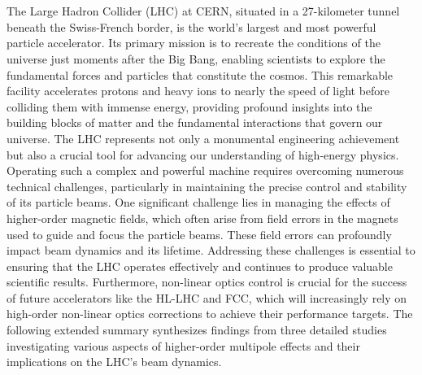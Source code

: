 \chapter{}





{
\fontsize{\fontsizesummary}{\fontskipsummary}\selectfont

The Large Hadron Collider (LHC) at CERN, situated in a 27-kilometer tunnel beneath the Swiss-French
border, is the world's largest and most powerful particle accelerator. Its primary mission is to
recreate the conditions of the universe just moments after the Big Bang, enabling scientists to
explore the fundamental forces and particles that constitute the cosmos. This remarkable facility
accelerates protons and heavy ions to nearly the speed of light before colliding them with immense
energy, providing profound insights into the building blocks of matter and the fundamental
interactions that govern our universe. The LHC represents not only a monumental engineering
achievement but also a crucial tool for advancing our understanding of high-energy physics.
\\
\indent
Operating such a complex and powerful machine requires overcoming numerous technical challenges,
particularly in maintaining the precise control and stability of its particle beams. One significant
challenge lies in managing the effects of higher-order magnetic fields, which often arise from field
errors in the magnets used to guide and focus the particle beams. These field errors can profoundly
impact beam dynamics and its lifetime. Addressing these challenges is essential to ensuring that
the LHC operates effectively and continues to produce valuable scientific results. Furthermore,
non-linear optics control is crucial for the success of future accelerators like the HL-LHC and FCC,
which will increasingly rely on high-order non-linear optics corrections to achieve their
performance targets. The following extended summary synthesizes findings from three detailed studies
investigating various aspects of higher-order multipole effects and their implications on the LHC's
beam dynamics.


}
